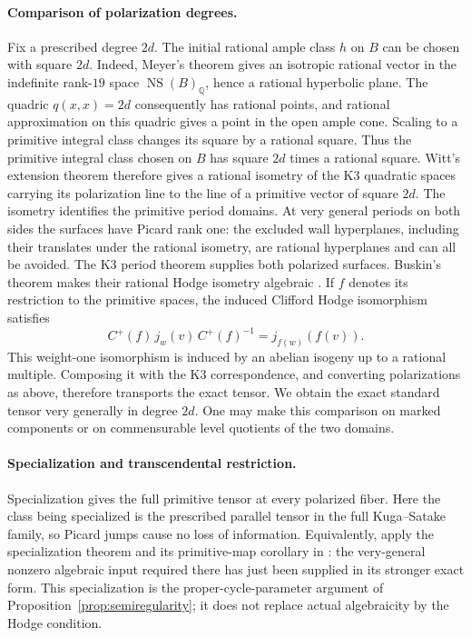 \documentclass[11pt]{article}
\numberwithin{equation}{section}
\theoremstyle{definition}
\theoremstyle{remark}
\newcommand{\Q}{\mathbb Q}
\DeclareMathOperator{\NS}{NS}
\begin{document}
\paragraph{Comparison of polarization degrees.}
Fix a prescribed degree $2d$.  The initial rational ample
class $h$ on $B$ can be chosen with square $2d$.  Indeed,
Meyer's theorem gives an isotropic rational vector in the
indefinite rank-$19$ space $\NS(B)_{\Q}$, hence a rational
hyperbolic plane.  The quadric $q(x,x)=2d$ consequently has
rational points, and rational approximation on this quadric
gives a point in the open ample cone.  Scaling to a primitive
integral class changes its square by a rational square.
Thus the primitive integral class chosen on $B$ has square $2d$
times a rational square.  Witt's extension theorem
therefore gives a rational isometry of the K3 quadratic
spaces carrying its polarization line to the line of
a primitive vector of square $2d$.  The isometry
identifies the primitive period domains.  At very general
periods on both sides the surfaces have Picard rank one:
the excluded wall hyperplanes, including their translates
under the rational isometry, are rational hyperplanes
and can all be avoided.  The K3 period theorem supplies
both polarized surfaces.  Buskin's theorem makes their
rational Hodge isometry algebraic \cite{Buskin}.
If $f$ denotes its restriction to the primitive spaces,
the induced Clifford Hodge isomorphism satisfies
\[
 C^+(f)\,j_w(v)\,C^+(f)^{-1}
       =j_{f(w)}(f(v)).
\]
This weight-one isomorphism is induced by an abelian
isogeny up to a rational multiple.  Composing it with
the K3 correspondence, and converting polarizations
as above, therefore transports the exact tensor.
We obtain the exact standard tensor very generally in
degree $2d$.  One may make this comparison on marked
components or on commensurable level quotients of the
two domains.

\paragraph{Specialization and transcendental restriction.}
Specialization gives the full primitive tensor at
every polarized fiber.  Here the class being specialized
is the prescribed parallel tensor in the full
Kuga--Satake family, so Picard jumps cause no loss of
information.  Equivalently, apply the specialization
theorem and its primitive-map corollary in
\cite[Theorem~1.2 and Corollary~5.5]{CKS}: the very-general nonzero
algebraic input required there has just been supplied
in its stronger exact form.  This specialization is
the proper-cycle-parameter argument of
Proposition~\ref{prop:semiregularity}; it does not
replace actual algebraicity by the Hodge condition.
\end{document}
